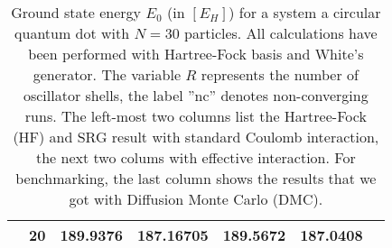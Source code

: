 \begin{table}
\begin{center}
\begin{tabular}{|c|c|c|c|c|c|c|}
&20 &189.9376 &187.16705 &189.5672 &187.0408 & \\
\hline
\end{tabular}
\end{center}
\caption{Ground state energy $E_0$ (in $\left[E_H\right]$) for a system a circular quantum dot with $N=30$ particles. All calculations have been performed with Hartree-Fock basis and White's generator. The variable $R$ represents the number of oscillator shells, the label ''nc'' denotes non-converging runs. The left-most two columns list the Hartree-Fock (HF) and SRG result with standard Coulomb interaction, the next two colums with effective interaction.
For benchmarking, the last column shows the results that we got with Diffusion Monte Carlo (DMC).}
\label{tab:fulltab7}
\end{table}

